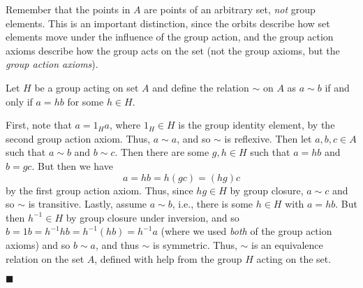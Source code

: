 \documentclass[12pt]{article}
\renewcommand{\qed}{\hfill$\blacksquare$}
\renewenvironment{proof}{\begin{addmargin}[1em]{0em}\begin{newproof}}{\end{newproof}\end{addmargin}\qed}
\begin{document}
Remember that the points in $A$ are points of an arbitrary set, \textit{not} group elements. This is an important distinction, since the orbits describe how set elements move under the influence of the group action, and the group action axioms describe how the group acts on the set (not the group axioms, but the \textit{group action axioms}).\\
\begin{proof}
Let $H$ be a group acting on set $A$ and define the relation $\sim$ on $A$ as $a\sim b$ if and only if $a=hb$ for some $h\in H$.

First, note that $a=1_H a$, where $1_H\in H$ is the group identity element, by the second group action axiom. Thus, $a\sim a$, and so $\sim$ is reflexive. Then let $a,b,c\in A$ such that $a\sim b$ and $b\sim c$. Then there are some $g,h\in H$ such that $a=hb$ and $b=gc$. But then we have $$ a = hb = h\left(gc\right) = \left(hg\right) c $$ by the first group action axiom. Thus, since $hg\in H$ by group closure, $a\sim c$ and so $\sim$ is transitive. Lastly, assume $a \sim b$, i.e., there is some $h\in H$ with $a=hb$. But then $h^{-1}\in H$ by group closure under inversion, and so $b = 1b = h^{-1}hb = h^{-1}\left(hb\right) = h^{-1}a $ (where we used \textit{both} of the group action axioms) and so $b\sim a$, and thus $\sim $ is symmetric. Thus, $\sim$ is an equivalence relation on the set $A$, defined with help from the group $H$ acting on the set.
\end{proof}
\end{document}

